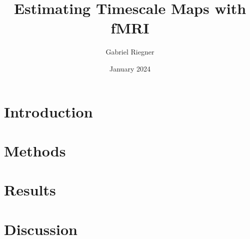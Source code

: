 \documentclass[10pt]{article}
\title{Estimating Timescale Maps with fMRI}
\author{Gabriel Riegner}
\date{January 2024}
\begin{document}
\maketitle

\section*{Introduction}

\section*{Methods}
\section*{Results}
\section*{Discussion}

\printbibliography
\end{document}
